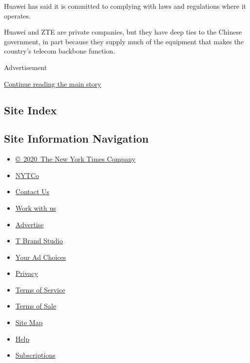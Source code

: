 Huawei has said it is committed to complying with laws and regulations
where it operates.

Huawei and ZTE are private companies, but they have deep ties to the
Chinese government, in part because they supply much of the equipment
that makes the country's telecom backbone function.

Advertisement

\protect\hyperlink{after-bottom}{Continue reading the main story}

\hypertarget{site-index}{%
\subsection{Site Index}\label{site-index}}

\hypertarget{site-information-navigation}{%
\subsection{Site Information
Navigation}\label{site-information-navigation}}

\begin{itemize}
\tightlist
\item
  \href{https://help.nytimes3xbfgragh.onion/hc/en-us/articles/115014792127-Copyright-notice}{©~2020~The
  New York Times Company}
\end{itemize}

\begin{itemize}
\tightlist
\item
  \href{https://www.nytco.com/}{NYTCo}
\item
  \href{https://help.nytimes3xbfgragh.onion/hc/en-us/articles/115015385887-Contact-Us}{Contact
  Us}
\item
  \href{https://www.nytco.com/careers/}{Work with us}
\item
  \href{https://nytmediakit.com/}{Advertise}
\item
  \href{http://www.tbrandstudio.com/}{T Brand Studio}
\item
  \href{https://www.nytimes3xbfgragh.onion/privacy/cookie-policy\#how-do-i-manage-trackers}{Your
  Ad Choices}
\item
  \href{https://www.nytimes3xbfgragh.onion/privacy}{Privacy}
\item
  \href{https://help.nytimes3xbfgragh.onion/hc/en-us/articles/115014893428-Terms-of-service}{Terms
  of Service}
\item
  \href{https://help.nytimes3xbfgragh.onion/hc/en-us/articles/115014893968-Terms-of-sale}{Terms
  of Sale}
\item
  \href{https://spiderbites.nytimes3xbfgragh.onion}{Site Map}
\item
  \href{https://help.nytimes3xbfgragh.onion/hc/en-us}{Help}
\item
  \href{https://www.nytimes3xbfgragh.onion/subscription?campaignId=37WXW}{Subscriptions}
\end{itemize}

